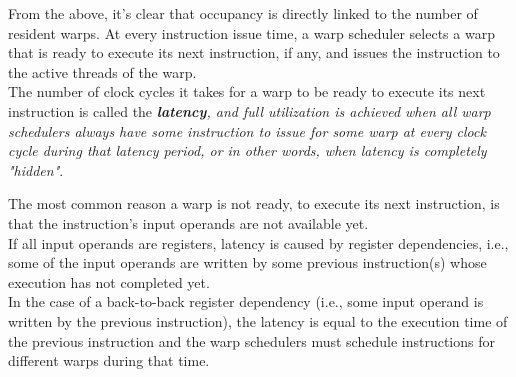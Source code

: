 	From the above, it's clear that occupancy is directly linked to the number of resident warps. At every instruction issue time, a warp scheduler selects a warp that is ready to execute its next instruction, if any, and issues the instruction to the active threads of the warp.\\
	The number of clock cycles it takes for a warp to be ready to execute its next instruction is called the \textit{\textbf{latency}, and full utilization is achieved when all warp schedulers always have some instruction to issue for some warp at every clock cycle during that latency period, or in other words,	when latency is completely "hidden"}. 
	
	The most common reason a warp is not ready, to execute its next instruction, is that the instruction's input operands are not available yet.\\
	If all input operands are registers, latency is caused by register dependencies, i.e., some of the input operands are written by some previous instruction(s) whose execution has	not completed yet.\\ In the case of a back-to-back register dependency (i.e., some input
	operand is written by the previous instruction), the latency is equal to the execution time of the previous instruction and the warp schedulers must schedule instructions for different warps during that time.\\
	
